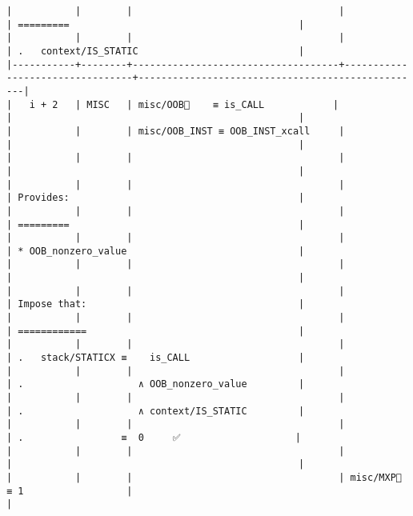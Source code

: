 \documentclass[varwidth=\maxdimen,margin=0.5cm,multi={verbatim}]{standalone}
\begin{document}
\begin{verbatim}
|           |        |                                    |                                 | =========                                        |
|           |        |                                    |                                 | .   context/IS_STATIC                            |
|-----------+--------+------------------------------------+---------------------------------+--------------------------------------------------|
|   i + 2   | MISC   | misc/OOB🚩    ≡ is_CALL            |                                 |                                                  |
|           |        | misc/OOB_INST ≡ OOB_INST_xcall     |                                 |                                                  |
|           |        |                                    |                                 |                                                  |
|           |        |                                    |                                 | Provides:                                        |
|           |        |                                    |                                 | =========                                        |
|           |        |                                    |                                 | * OOB_nonzero_value                              |
|           |        |                                    |                                 |                                                  |
|           |        |                                    |                                 | Impose that:                                     |
|           |        |                                    |                                 | ============                                     |
|           |        |                                    |                                 | .   stack/STATICX ≡    is_CALL                   |
|           |        |                                    |                                 | .                    ∧ OOB_nonzero_value         |
|           |        |                                    |                                 | .                    ∧ context/IS_STATIC         |
|           |        |                                    |                                 | .                 ≡  0     ✅                    |
|           |        |                                    |                                 |                                                  |
|           |        |                                    | misc/MXP🚩 ≡ 1                  |                                                  |

\end{verbatim}
\end{document}
